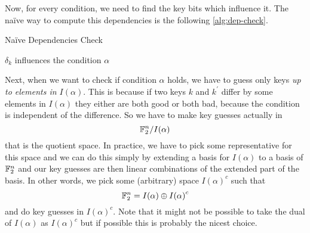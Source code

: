 Now, for every condition, we need to find the key bits which influence it.
The na\"ive way to compute this dependencies is the following \cref{alg:dep-check}.
\begin{algorithm}
    \caption{Na\"ive Dependencies Check}\label{alg:dep-check}
\begin{algorithmic}[1]
    \Statex{}
                    \State{}$\delta_k$ influences the condition $\alpha$
                \EndIf{}
            \EndFor{}
        \EndFor{}
    \EndFor{}
    \State{}
    \EndFunction{}
\end{algorithmic}
\end{algorithm}

Next, when we want to check if condition $\alpha$ holds, we have to guess only keys {\emph{up to elements in $I(\alpha)$}}.
This is because if two keys $k$ and $k^\prime$ differ by some elements in $I(\alpha)$ they either are both good or both bad, because the condition is independent of the difference.
So we have to make key guesses actually in
\begin{equation*}
    \mathbb{F}_2^n / I(\alpha)
\end{equation*}
that is the quotient space.
In practice, we have to pick some representative for this space and we can do this simply by extending a basis for $I(\alpha)$ to a basis of $\mathbb{F}_2^n$ and our key guesses are then linear combinations of the extended part of the basis.
In other words, we pick some (arbitrary) space ${I(\alpha)}^c$ such that
\begin{equation*}
    \mathbb{F}_2^n = I(\alpha) \oplus {I(\alpha)}^c
\end{equation*}
and do key guesses in ${I(\alpha)}^c$.
Note that it might not be possible to take the dual of $I(\alpha)$ as ${I(\alpha)}^c$ but if possible this is probably the nicest choice.

